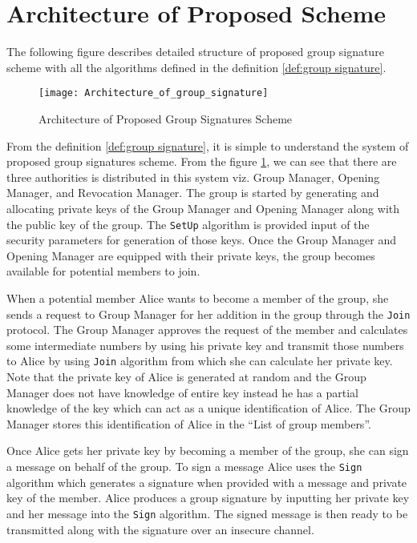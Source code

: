 \section{Architecture of Proposed Scheme}
The following figure describes detailed structure of proposed group signature scheme with all the algorithms defined in the definition \ref{def:group signature}.

\begin{figure}[!h]
    \centering
    \texttt{[image: Architecture\_of\_group\_signature]}
    \caption{Architecture of Proposed Group Signatures Scheme}
    \label{fig:Architecture of Proposed Group Signatures Scheme}
\end{figure}

From the definition \ref{def:group signature}, it is simple to understand the system of proposed group signatures scheme. From the figure \ref{fig:Architecture of Proposed Group Signatures Scheme}, we can see that there are three authorities is distributed in this system viz. Group Manager, Opening Manager, and Revocation Manager. The group is started by generating and allocating private keys of the Group Manager and Opening Manager along with the public key of the group. The \texttt{SetUp} algorithm is provided input of the security parameters for generation of those keys. Once the Group Manager and Opening Manager are equipped with their private keys, the group becomes available for potential members to join. 

When a potential member Alice wants to become a member of the group, she sends a request to Group Manager for her addition in the group through the \texttt{Join} protocol. The Group Manager approves the request of the member and calculates some intermediate numbers by using his private key and transmit those numbers to Alice by using \texttt{Join} algorithm from which she can calculate her private key. Note that the private key of Alice is generated at random and the Group Manager does not have knowledge of entire key instead he has a partial knowledge of the key which can act as a unique identification of Alice. The Group Manager stores this identification of Alice in the \textquotedblleft List of group members\textquotedblright.

Once Alice gets her private key by becoming a member of the group, she can sign a message on behalf of the group. To sign a message Alice uses the \texttt{Sign} algorithm which generates a signature when provided with a message and private key of the member. Alice produces a group signature by inputting her private key and her message into the \texttt{Sign} algorithm. The signed message is then ready to be transmitted along with the signature over an insecure channel.

